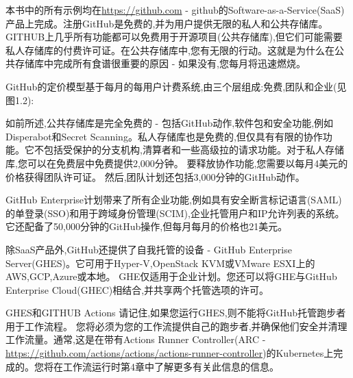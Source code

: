 本书中的所有示例均在\url{https://github.com} - github的Software-as-a-Service(SaaS)产品上完成。注册GitHub是免费的,并为用户提供无限的私人和公共存储库。 GITHUB上几乎所有功能都可以免费用于开源项目(公共存储库),但它们可能需要私人存储库的付费许可证。在公共存储库中,您有无限的行动。这就是为什么在公共存储库中完成所有食谱很重要的原因 - 如果没有,您每月将迅速燃烧。

GitHub的定价模型基于每月的每用户计费系统,由三个层组成:免费,团队和企业(见图1.2):


如前所述,公共存储库是完全免费的 - 包括GitHub动作,软件包和安全功能,例如Disperabot和Secret Scanning。私人存储库也是免费的,但仅具有有限的协作功能。它不包括受保护的分支机构,清算者和一些高级拉的请求功能。对于私人存储库,您可以在免费层中免费提供2,000分钟。 要释放协作功能,您需要以每月4美元的价格获得团队许可证。 然后,团队计划还包括3,000分钟的GitHub动作。

GitHub Enterprise计划带来了所有企业功能,例如具有安全断言标记语言(SAML)的单登录(SSO)和用于跨域身份管理(SCIM),企业托管用户和IP允许列表的系统。它还配备了50,000分钟的GitHub操作,但每月每月的价格也21美元。

除SaaS产品外,GitHub还提供了自我托管的设备 - GitHub Enterprise Server(GHES)。它可用于Hyper-V,OpenStack KVM或VMware ESXI上的AWS,GCP,Azure或本地。 GHE仅适用于企业计划。您还可以将GHE与GitHub Enterprise Cloud(GHEC)相结合,并共享两个托管选项的许可。

\begin{myTip}{GHES和GITHUB Actions}
请记住,如果您运行GHES,则不能将GitHub托管跑步者用于工作流程。 您将必须为您的工作流提供自己的跑步者,并确保他们安全并清理工作流量。通常,这是在带有Actions Runner Controller(ARC - \url{https://github.com/actions/actions/actions-runner-controller})的Kubernetes上完成的。您将在工作流运行时第4章中了解更多有关此信息的信息。
\end{myTip}








